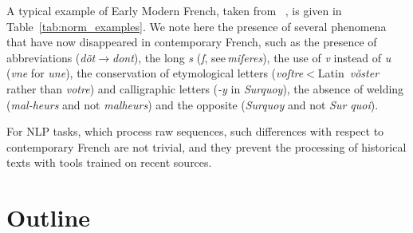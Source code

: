 A typical example of Early Modern French, taken from ~, is given in Table~\ref{tab:norm_examples}. We note here the presence of several phenomena that have now disappeared in contemporary French, such as the presence of abbreviations (\emph{dõt}$\to$\emph{dont}), the long \emph{s} (\emph{ſ}, see\,\emph{miſeres}), the use of \emph{v} instead of \emph{u} (\emph{vne} for \emph{une}), the conservation of etymological letters (\emph{voſtre}$<$Latin~\emph{vŏster} rather than \emph{votre}) and calligraphic letters (\emph{-y} in \emph{Surquoy}), the absence of welding  (\emph{\mbox{mal-heurs}} and not \emph{malheurs}) and the opposite (\emph{Surquoy} and not \emph{Sur quoi}).

For NLP tasks, which process raw sequences, such differences with respect to contemporary French are not trivial, and they prevent the processing of historical texts with tools trained on recent sources.

\section{Outline}

